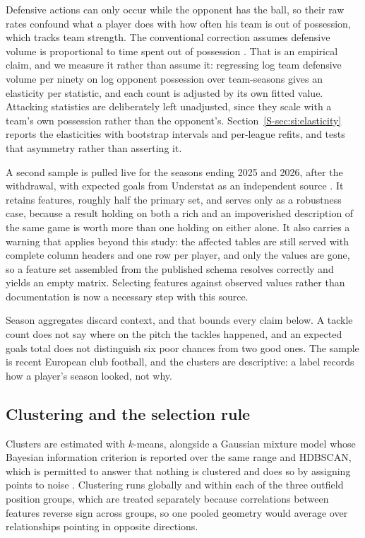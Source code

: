 Defensive actions can only occur while the opponent has the ball, so their raw rates confound
what a player does with how often his team is out of possession, which tracks team strength. The
conventional correction assumes defensive volume is proportional to time spent out of possession
\citep{knutson2014possession}. That is an empirical claim, and we measure it rather than assume
it: regressing log team defensive volume per ninety on log opponent possession over
\ArcPadjTeamSeasons{} team-seasons gives an elasticity per statistic, and each count is adjusted
by its own fitted value. Attacking statistics are deliberately left unadjusted, since they scale
with a team's own possession rather than the opponent's.
Section~\ref{S-sec:si:elasticity} reports the elasticities with bootstrap intervals and
per-league refits, and tests that asymmetry rather than asserting it.

A second sample is pulled live for the seasons ending 2025 and 2026, after the withdrawal, with
expected goals from Understat as an independent source \citep{robberechts2026soccerdata,
understat2026}. It retains \NFeatures{} features, roughly half the primary set, and serves only
as a robustness case, because a result holding on both a rich and an impoverished description of
the same game is worth more than one holding on either alone. It also carries a warning that
applies beyond this study: the affected tables are still served with complete column headers and
one row per player, and only the values are gone, so a feature set assembled from the published
schema resolves correctly and yields an empty matrix. Selecting features against observed values
rather than documentation is now a necessary step with this source.

Season aggregates discard context, and that bounds every claim below. A tackle count does not
say where on the pitch the tackles happened, and an expected goals total does not distinguish
six poor chances from two good ones. The sample is recent European club football, and the
clusters are descriptive: a label records how a player's season looked, not why.

\subsection{Clustering and the selection rule}
\label{sec:methods:selection}

Clusters are estimated with $k$-means, alongside a Gaussian mixture model whose Bayesian
information criterion is reported over the same range and HDBSCAN, which is permitted to answer
that nothing is clustered and does so by assigning points to noise \citep{campello2013density}.
Clustering runs globally and within each of the three outfield position groups, which are
treated separately because correlations between features reverse sign across groups, so one
pooled geometry would average over relationships pointing in opposite directions.

